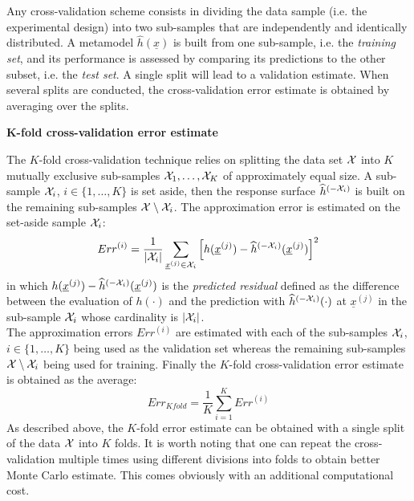 {    Any cross-validation scheme consists in dividing the data sample (i.e. the experimental design) into two sub-samples that are independently and identically distributed. A metamodel $\widehat{h}(\underline{x})$ is built from one sub-sample, i.e. the \emph{training set}, and its performance is assessed by comparing its predictions to the other subset, i.e. the \emph{test set}. A single split will lead to a validation estimate. When several splits are conducted, the cross-validation error estimate is obtained by averaging over the splits.
    
    \textbf{K-fold cross-validation error estimate} \vspace{2mm}
    
    The $K$-fold cross-validation technique relies on splitting the data set ${\mathcal X}$ into $K$ mutually exclusive sub-samples ${\mathcal X}_1, \dots, {\mathcal X}_K$ of approximately equal size. A sub-sample ${\mathcal X}_i$, $i \in \{ 1, \dots, K\} $ is set aside, then the response surface $\widehat{h}^{(-{\mathcal X}_i)}$ is built on the remaining sub-samples ${\mathcal X} \setminus {\mathcal X}_i$. The approximation error is estimated on the set-aside sample ${\mathcal X}_i$:
    \begin{equation}
      Err^{(i)}  = \dfrac{1}{ |{\mathcal X}_i|}  \sum\limits_{\underline{x}^{(j)} \in {\mathcal X}_i} \left[ h(\underline{x}^{(j)}) - \widehat{h}^{(-{\mathcal X}_i)} {(\underline{x}^{(j)})} \right]^2
    \end{equation}
    in which $h(\underline{x}^{(j)}) - \widehat{h}^{(-{\mathcal X}_i)} {(\underline{x}^{(j)})}$ is the \emph{predicted residual} defined as the difference between the evaluation of $h(\cdot)$ and the prediction with $\widehat{h}^{(-{\mathcal X}_i)}(\cdot)$ at $\underline{x}^{(j)}$ in the sub-sample ${\mathcal X}_i$ whose cardinality is $|{\mathcal X}_i|$.\\
    The approximation errors $Err^{(i)}$ are estimated with each of the sub-samples ${\mathcal X}_i$, $i \in \{ 1, \dots, K\} $ being used as the validation set whereas the remaining sub-samples ${\mathcal X} \setminus {\mathcal X}_i$ being used for training. Finally the $K$-fold cross-validation error estimate is obtained as the average:
    \begin{equation}
	    Err_{Kfold} = \dfrac{1}{K} \sum\limits_{i=1}^{K} Err^{(i)}
    \end{equation}
    As described above, the $K$-fold error estimate can be obtained with a single split of the data ${\mathcal X}$ into $K$ folds. It is worth noting that one can repeat the cross-validation multiple times using different divisions into folds to obtain better Monte Carlo estimate. This comes obviously with an additional computational cost.
  
}
